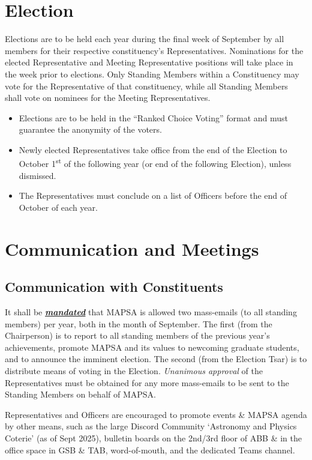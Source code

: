 \documentclass[8pt]{article}
\begin{document}
	\section{Election}\label{sec:elections}
	Elections are to be held each year during the final week of September by all members for their respective constituency's Representatives. Nominations for the elected Representative and Meeting Representative positions will take place in the week prior to elections. Only Standing Members within a Constituency may vote for the Representative of that constituency, while all Standing Members shall vote on nominees for the Meeting Representatives. 
	\begin{itemize}	
		\item Elections are to be held in the ``Ranked Choice Voting'' format and must guarantee the anonymity of the voters. 
		\item Newly elected Representatives take office from the end of the Election to October 1\textsuperscript{st} of the following year (or end of the following Election), unless dismissed.
		\item The Representatives must conclude on a list of Officers before the end of October of each year.
	\end{itemize}
	
	\section{Communication and Meetings}
	\subsection{Communication with Constituents}
	It shall be \textbf{\textit{\underline{mandated}}} that MAPSA is allowed two mass-emails (to all standing members) per year, both in the month of September. The first (from the Chairperson) is to report to all standing members of the previous year's achievements, promote MAPSA and its values to newcoming graduate students, and to announce the imminent election. The second (from the Election Tsar) is to distribute means of voting in the Election. \textit{Unanimous approval} of the Representatives must be obtained for any more mass-emails to be sent to the Standing Members on behalf of MAPSA.
	
	Representatives and Officers are encouraged to promote events \& MAPSA agenda by other means, such as the large Discord Community `Astronomy and Physics Coterie' (as of Sept 2025), bulletin boards on the 2nd/3rd floor of ABB \& in the office space in GSB \& TAB, word-of-mouth, and the dedicated Teams channel.
	
\end{document}
